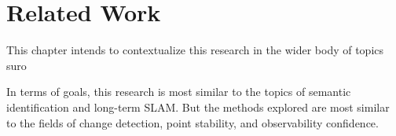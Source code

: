 \section{Related Work}
\label{sec:related_work}

This chapter intends to contextualize this research in the wider body of topics suro

In terms of goals, this research is most similar to the topics of semantic identification and long-term SLAM. But the methods explored are most similar to the fields of change detection, point stability, and observability confidence.

% 